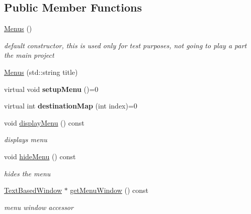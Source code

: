 \subsection*{Public Member Functions}
\begin{DoxyCompactItemize}
\item 
\hypertarget{class_menus_aca176c63a5d8aed17b64ec49ffe06f0a}{}\label{class_menus_aca176c63a5d8aed17b64ec49ffe06f0a} 
\hyperlink{class_menus_aca176c63a5d8aed17b64ec49ffe06f0a}{Menus} ()
\begin{DoxyCompactList}\small\item\em default constructor, this is used only for test purposes, not going to play a part the main project \end{DoxyCompactList}\item 
\hyperlink{class_menus_a79335eb0ba0047d0d9a52a646b191c68}{Menus} (std\+::string title)
\item 
\hypertarget{class_menus_a3f4a033bc85776464e64fff6a0e65d42}{}\label{class_menus_a3f4a033bc85776464e64fff6a0e65d42} 
virtual void {\bfseries setup\+Menu} ()=0
\item 
\hypertarget{class_menus_a1c1a38c384ed5760284d7320b038196f}{}\label{class_menus_a1c1a38c384ed5760284d7320b038196f} 
virtual int {\bfseries destination\+Map} (int index)=0
\item 
\hypertarget{class_menus_a42dfc1dd67100a8e5c063eee303c743a}{}\label{class_menus_a42dfc1dd67100a8e5c063eee303c743a} 
void \hyperlink{class_menus_a42dfc1dd67100a8e5c063eee303c743a}{display\+Menu} () const
\begin{DoxyCompactList}\small\item\em displays menu \end{DoxyCompactList}\item 
\hypertarget{class_menus_a6d92efc5a1ae54920c049b78994ba710}{}\label{class_menus_a6d92efc5a1ae54920c049b78994ba710} 
void \hyperlink{class_menus_a6d92efc5a1ae54920c049b78994ba710}{hide\+Menu} () const
\begin{DoxyCompactList}\small\item\em hides the menu \end{DoxyCompactList}\item 
\hypertarget{class_menus_aee335b59de094e618d1cbc4cda351e45}{}\label{class_menus_aee335b59de094e618d1cbc4cda351e45} 
\hyperlink{class_text_based_window}{Text\+Based\+Window} $\ast$ \hyperlink{class_menus_aee335b59de094e618d1cbc4cda351e45}{get\+Menu\+Window} () const
\begin{DoxyCompactList}\small\item\em menu window accessor \end{DoxyCompactList}\item 

\end{DoxyCompactItemize}
